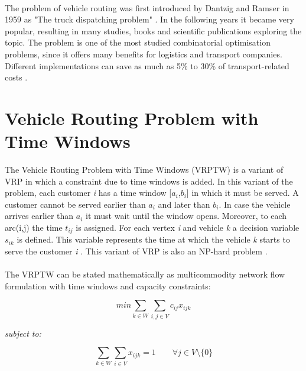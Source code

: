 \documentclass[a4paper,twoside,12pt]{book}
\begin{document}
\paragraph{}
The problem of vehicle routing was first introduced by Dantzig and Ramser in 1959 as "The truck dispatching problem" \cite{bib:article:TruckDispatching}. In the following years it became very popular, resulting in many studies, books and scientific publications exploring the topic. The problem is one of the most studied combinatorial optimisation problems, since it offers many benefits for logistics and transport companies. Different implementations can save as much as 5\% to 30\% of transport-related costs \cite{bib:book:GeometricModellingCostSavings}.

\section{Vehicle Routing Problem with Time Windows}

The Vehicle Routing Problem with Time Windows (VRPTW) is a variant of VRP in which a constraint due to time windows is added. In this variant of the problem, each customer \textit{i} has a time window [$a_{i}$,$b_{i}$] in which it must be served. A customer cannot be served earlier than $a_{i}$ and later than $b_{i}$. In case the vehicle arrives earlier than $a_{i}$ it must wait until the window opens. Moreover, to each arc(i,j) the time \textit{$t_{ij}$} is assigned. For each vertex \textit{i} and vehicle \textit{k} a decision variable \textit{$s_{ik}$} is defined. This variable represents the time at which the vehicle \textit{k} starts to serve the customer \textit{i} \cite{bib:chapter:VRPTW}.
This variant of VRP is also an NP-hard problem \cite{bib:article:Savelsbergh}.
\paragraph{}
The VRPTW can be stated mathematically as multicommodity network flow formulation with time windows and capacity constraints:\cite{bib:chapter:VRPTW} 

\begin{equation}
min \sum_{k \in W}\sum_{i,j \in V} c_{ij}x_{ijk}
\end{equation}

\textit{subject to:}

\begin{equation}
\sum_{k \in W}\sum_{i \in V}x_{ijk} = 1 \qquad \forall j \in V \setminus \lbrace 0 \rbrace
\end{equation}
\end{document}

